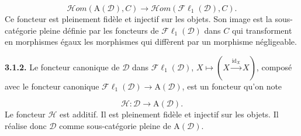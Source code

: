 \[
\mathcal H\!om(\mathrm A(\mathcal D),C)
\longrightarrow
\mathcal H\!om(\mathcal{F}\ell_1(\mathcal D),C).
\tag{3.1.1.1}
\]
Ce foncteur est pleinement fidèle et injectif sur les objets. Son image est la
sous-catégorie pleine définie par les foncteurs de
$\mathcal{F}\ell_1(\mathcal D)$ dans $C$ qui transforment en morphismes égaux
les morphismes qui diffèrent par un morphisme négligeable.

\medskip
\noindent\textbf{3.1.2.}\quad
Le foncteur canonique de $\mathcal D$ dans $\mathcal{F}\ell_1(\mathcal D)$,
$X\longmapsto(X\xrightarrow{\operatorname{id}_X}X)$, composé avec le foncteur
canonique $\mathcal{F}\ell_1(\mathcal D)\longrightarrow\mathrm A(\mathcal D)$,
est un foncteur qu'on note

\[
\mathcal H\colon\mathcal D\longrightarrow\mathrm A(\mathcal D).
\tag{3.1.2.1}
\]
Le foncteur $\mathcal H$ est additif. Il est pleinement fidèle et injectif sur
les objets. Il réalise donc $\mathcal D$ comme sous-catégorie pleine de
$\mathrm A(\mathcal D)$.
\endgroup
